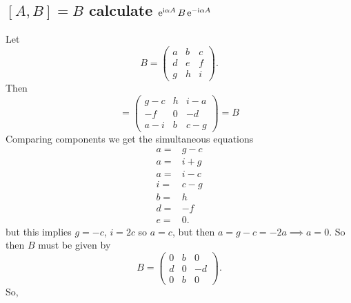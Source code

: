 \documentclass[main.tex]{subfiles}
\begin{document}
\subsection{$[A,B]=B$ calculate $\operatorname{e}^{\mathrm{i}\alpha A}B\operatorname{e}^{-\mathrm{i}\alpha A}$}
Let
\begin{equation}
B =\begin{pmatrix}  a & b & c  \\ d & e & f \\ g & h & i  \end{pmatrix}.
\end{equation}
Then 
\begin{equation}
[A,B]=\begin{pmatrix}  g-c & h & i-a  \\ -f & 0 & -d \\ a-i & b & c-g  \end{pmatrix}=B
\end{equation}
Comparing components we get the simultaneous equations
\begin{align}
a=&g-c\\
a=&i+g\\
a=&i-c\\
i=&c-g\\
b=&h\\
d=&-f\\
e=&0.
\end{align}
but this implies $g=-c$, $i=2c$ so $a=c$, but then $a=g-c=-2a\implies a=0$. So then $B$ must be given by
\begin{equation}
B=\begin{pmatrix}  0 & b & 0  \\ d & 0 & -d \\ 0 & b & 0  \end{pmatrix}.
\end{equation}
So,
\end{document}
